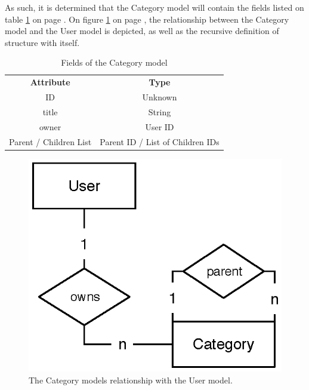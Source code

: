 			As such, it is determined that the Category model will contain the fields listed on table \ref{fig:model:category} on page \pageref{fig:model:category}. On figure \ref{fig:relationship:category-user} on page \pageref{fig:relationship:category-user}, the relationship between the Category model and the User model is depicted, as well as the recursive definition of structure with itself.


			\begin{table}[p]
				\centering
				\begin{tabular}{c|c}
					\textbf{Attribute} 		& \textbf{Type} 		\\
					ID 						& Unknown 	\\
					title 					& String 	\\
					owner 					& User ID 	\\
					Parent / Children List 	& Parent ID / List of Children IDs 	\\
				\end{tabular}
				\caption{Fields of the Category model}
				\label{fig:model:category}
			\end{table}
			\begin{figure}[p]
				\centering
				\includegraphics[scale=0.75]{figures/design/uml/erd/user-category.eps}
				\caption{The Category models relationship with the User model.}
				\label{fig:relationship:category-user}
			\end{figure}


